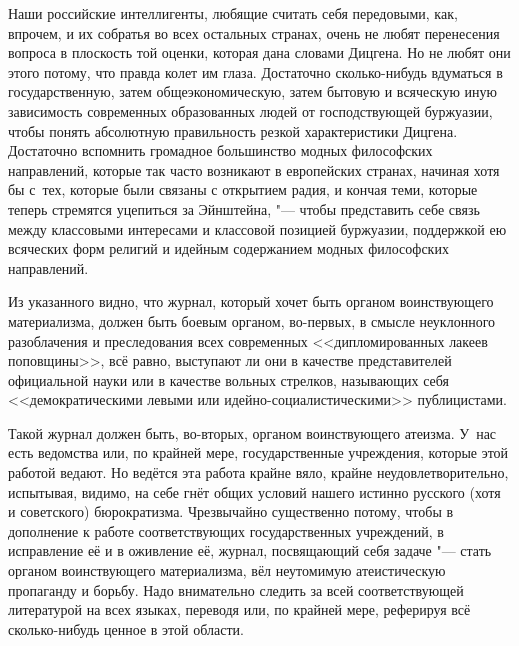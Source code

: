 Наши российские интеллигенты, любящие считать себя передовыми, как, впрочем,
и их собратья во всех остальных странах, очень не любят перенесения вопроса
в плоскость той оценки, которая дана словами Дицгена. Но не любят они этого
потому, что правда колет им глаза. Достаточно сколько-нибудь вдуматься в
государственную, затем общеэкономическую, затем бытовую и всяческую иную
зависимость современных образованных людей от господствующей буржуазии,
чтобы понять абсолютную правильность резкой характеристики
Дицгена. Достаточно вспомнить громадное большинство модных философских
направлений, которые так часто возникают в европейских странах, начиная хотя
бы с~тех, которые были связаны с открытием радия, и кончая теми, которые
теперь стремятся уцепиться за Эйнштейна, "--- чтобы представить себе связь
между классовыми интересами и классовой позицией буржуазии, поддержкой ею
всяческих форм религий и идейным содержанием модных философских направлений.

Из указанного видно, что журнал, который хочет быть органом воинствующего
материализма, должен быть боевым органом, во-первых, в смысле неуклонного
разоблачения и преследования всех современных <<дипломированных лакеев
поповщины>>, всё равно, выступают ли они в качестве представителей
официальной науки или в качестве вольных стрелков, называющих себя
<<демократическими левыми или идейно-социалистическими>> публицистами.

Такой журнал должен быть, во-вторых, органом воинствующего атеизма. У~нас
есть ведомства или, по крайней мере, государственные учреждения, которые
этой работой ведают. Но ведётся эта работа крайне вяло, крайне
неудовлетворительно, испытывая, видимо, на себе гнёт общих условий нашего
истинно русского (хотя и советского) бюрократизма. Чрезвычайно существенно
потому, чтобы в дополнение к работе соответствующих государственных
учреждений, в исправление её и в оживление её, журнал, посвящающий себя
задаче "--- стать органом воинствующего материализма, вёл неутомимую
атеистическую пропаганду и борьбу. Надо внимательно следить за всей
соответствующей литературой на всех языках, переводя или, по крайней мере,
реферируя всё сколько-нибудь ценное в этой области.

